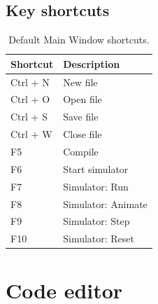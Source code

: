     \subsection{Key shortcuts}
        \begin{table}[h!]
            \centering
            \begin{tabular}{|l|l|}
                \hline
                \textbf{Shortcut}               & \textbf{Description}          \\\hline
                Ctrl + N                        & New file                      \\\hline
                Ctrl + O                        & Open file                     \\\hline
                Ctrl + S                        & Save file                     \\\hline
                Ctrl + W                        & Close file                    \\\hline
                F5                              & Compile                       \\\hline
                F6                              & Start simulator               \\\hline
                F7                              & Simulator: Run                \\\hline
                F8                              & Simulator: Animate            \\\hline
                F9                              & Simulator: Step               \\\hline
                F10                             & Simulator: Reset              \\\hline
            \end{tabular}
            \caption{Default Main Window shortcuts.}
        \end{table}

\section{Code editor}
